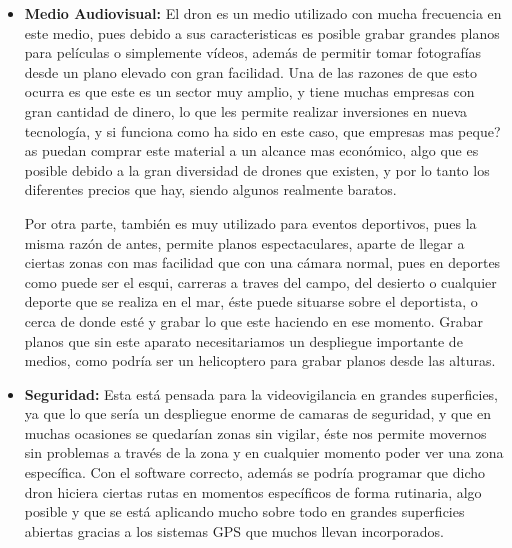 \documentclass{article}
\begin{document}
\begin{itemize}
	\item \textbf{Medio Audiovisual:} El dron es un medio utilizado con mucha frecuencia en este medio, pues debido a sus caracteristicas es posible grabar grandes planos para pel\'iculas o simplemente v\'ideos, adem\'as de permitir tomar fotograf\'ias desde un plano elevado con gran facilidad. Una de las razones de que esto ocurra es que este es un sector muy amplio, y tiene muchas empresas con gran cantidad de dinero, lo que les permite realizar inversiones en nueva tecnolog\'ia, y si funciona como ha sido en este caso, que empresas mas peque?as puedan comprar este material a un alcance mas econ\'omico, algo que es posible debido a la gran diversidad de drones que existen, y por lo tanto los diferentes precios que hay, siendo algunos realmente baratos. 	
	
	\hspace{1 cm} Por otra parte, tambi\'en es muy utilizado para eventos deportivos, pues la misma raz\'on de antes, permite planos espectaculares, aparte de llegar a ciertas zonas con mas facilidad que con una c\'amara normal, pues en deportes como puede ser el esqui, carreras a traves del campo, del desierto o cualquier deporte que se realiza en el mar, \'este puede situarse sobre el deportista, o cerca de donde est\'e y grabar lo que este haciendo en ese momento. Grabar planos que sin este aparato necesitariamos un despliegue importante de medios, como podr\'ia ser un helicoptero para grabar planos desde las alturas. 
	
	\item \textbf{Seguridad:} Esta est\'a pensada para la videovigilancia en grandes superficies, ya que lo que ser\'ia un despliegue enorme de camaras de seguridad, y que en muchas ocasiones se quedar\'ian zonas sin vigilar, \'este nos permite movernos sin problemas a trav\'es de la zona y en cualquier momento poder ver una zona espec\'ifica. Con el software correcto, adem\'as se podr\'ia programar que dicho dron hiciera ciertas rutas en momentos espec\'ificos de forma rutinaria, algo posible y que se est\'a aplicando mucho sobre todo en grandes superficies abiertas gracias a los sistemas GPS que muchos llevan incorporados.
	

\end{itemize}
\end{document}
